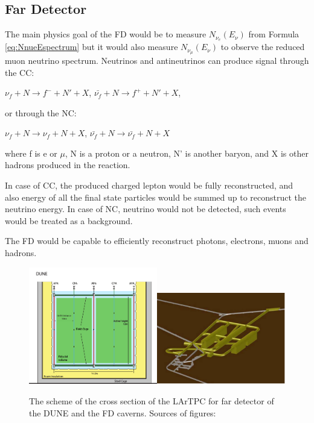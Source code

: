 \subsection{Far Detector}

The main physics goal of the FD would be to measure $N_{\nu_e}(E_{\nu})$  from Formula \ref{eq:NnueEspectrum} but it would also measure $N_{\nu_\mu}(E_{\nu})$ to observe the reduced muon neutrino spectrum. Neutrinos and antineutrinos can produce signal through the CC:

$\nu_f+N \rightarrow f^- + N' +X$, $\bar{\nu_f}+N \rightarrow f^+ + N' +X$,

or through the NC:

$\nu_f+N \rightarrow \nu_f + N +X$, $\bar{\nu_f}+N \rightarrow \bar{\nu_f} + N +X$

where f is e or $\mu$, N is a proton or a neutron, N' is another baryon, and X is other hadrons produced in the reaction.

In case of CC, the produced charged lepton would be fully reconstructed, and also energy of all the final state particles would be summed up to reconstruct the neutrino energy. In case of NC, neutrino would not be detected, such events would be treated as a background.

The FD would be capable to efficiently reconstruct photons, electrons, muons and hadrons. \\

\begin{figure}
\caption{The scheme of the cross section of the LArTPC for far detector of the DUNE and the FD caverns. Sources of figures: \cite{ref_LBNF_CDR}}
\label{fig:farDetector_TPC}
\centering
\includegraphics[width=0.5\textwidth, keepaspectratio=true]{figs/farDetector_TPC.png}\includegraphics[width=0.5\textwidth, keepaspectratio=true]{figs/farDetector_Caverns.png}
\end{figure}

